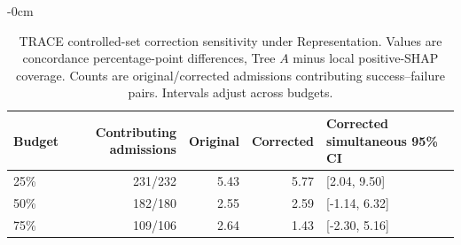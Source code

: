 \begin{table}[!htbp]
\begin{adjustwidth}{-\extralength}{0cm}
\centering\footnotesize\setlength{\tabcolsep}{4pt}
\caption{TRACE controlled-set correction sensitivity under Representation. Values are concordance percentage-point differences, Tree $A$ minus local positive-SHAP coverage. Counts are original/corrected admissions contributing success--failure pairs. Intervals adjust across budgets.}\label{tab:source-correction-controlled}
\begin{tabular}{lrrrl}\toprule
Budget & Contributing admissions & Original & Corrected & Corrected simultaneous 95\% CI\\\midrule
25\% & 231/232 & 5.43 & 5.77 & [2.04, 9.50] \\
50\% & 182/180 & 2.55 & 2.59 & [-1.14, 6.32] \\
75\% & 109/106 & 2.64 & 1.43 & [-2.30, 5.16] \\
\bottomrule\end{tabular}
\end{adjustwidth}
\end{table}
